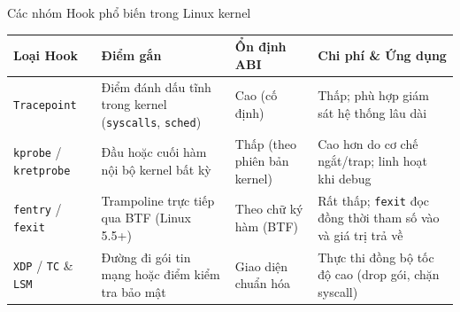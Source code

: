 \begin{frame}{Các nhóm Hook phổ biến trong Linux kernel}
  \small
  \renewcommand{\arraystretch}{1.20}
  \begin{tabular}{@{}L{0.19\textwidth}L{0.27\textwidth}L{0.17\textwidth}L{0.27\textwidth}@{}}
    \toprule
    \textbf{Loại Hook}                         & \textbf{Điểm gắn}                                                   & \textbf{Ổn định ABI}         & \textbf{Chi phí \& Ứng dụng}                                         \\
    \midrule
    \texttt{Tracepoint}                        & Điểm đánh dấu tĩnh trong kernel (\texttt{syscalls}, \texttt{sched}) & Cao (cố định)                & Thấp; phù hợp giám sát hệ thống lâu dài                              \\
    \texttt{kprobe} / \texttt{kretprobe}       & Đầu hoặc cuối hàm nội bộ kernel bất kỳ                              & Thấp (theo phiên bản kernel) & Cao hơn do cơ chế ngắt/trap; linh hoạt khi debug                     \\
    \texttt{fentry} / \texttt{fexit}           & Trampoline trực tiếp qua BTF (Linux 5.5+)                           & Theo chữ ký hàm (BTF)        & Rất thấp; \texttt{fexit} đọc đồng thời tham số vào và giá trị trả về \\
    \texttt{XDP} / \texttt{TC} \& \texttt{LSM} & Đường đi gói tin mạng hoặc điểm kiểm tra bảo mật                    & Giao diện chuẩn hóa          & Thực thi đồng bộ tốc độ cao (drop gói, chặn syscall)                 \\
    \bottomrule
  \end{tabular}
  \vspace{0.14cm}

\end{frame}

